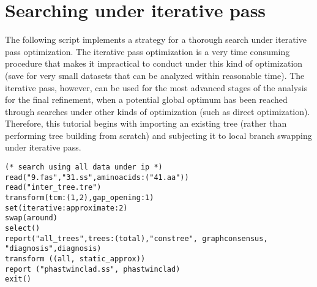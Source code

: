\section{Searching under iterative pass}{\label{tutorial4.2}}
The following script implements a strategy for a thorough search under iterative pass optimization. The iterative pass optimization is a very time consuming procedure that makes it impractical to conduct under this kind of optimization (save for very small datasets that can be analyzed within reasonable time). The iterative pass, however, can be used for the most advanced stages of the analysis for the final refinement, when a potential global optimum has been reached through searches under other kinds of optimization (such as direct optimization). Therefore, this tutorial begins with importing an existing tree (rather than performing tree building from scratch) and subjecting it to local branch swapping under iterative pass.

\begin{verbatim}
(* search using all data under ip *)
read("9.fas","31.ss",aminoacids:("41.aa"))
read("inter_tree.tre")
transform(tcm:(1,2),gap_opening:1)
set(iterative:approximate:2)
swap(around)
select()
report("all_trees",trees:(total),"constree", graphconsensus,
"diagnosis",diagnosis)
transform ((all, static_approx))
report ("phastwinclad.ss", phastwinclad)
exit()
\end{verbatim}

